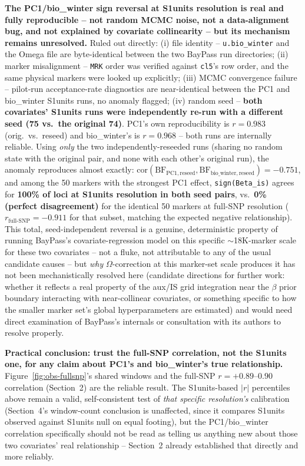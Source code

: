 \documentclass[11pt]{article}
\begin{document}
\textbf{The PC1/bio\_winter sign reversal at S1units resolution is real and fully
reproducible -- not random MCMC noise, not a data-alignment bug, and not explained by
covariate collinearity -- but its mechanism remains unresolved.} Ruled out directly:
(i) file identity -- \texttt{u.bio\_winter} and the Omega file are byte-identical between the
two BayPass run directories; (ii) marker misalignment -- \texttt{MRK} order was verified
against \texttt{cl5}'s row order, and the same physical markers were looked up explicitly;
(iii) MCMC convergence failure -- pilot-run acceptance-rate diagnostics are near-identical
between the PC1 and bio\_winter S1units runs, no anomaly flagged; (iv) random seed --
\textbf{both covariates' S1units runs were independently re-run with a different seed (75 vs.\
the original 74)}. PC1's own reproducibility is $r=0.983$ (orig.\ vs.\ reseed) and
bio\_winter's is $r=0.968$ -- both runs are internally reliable. Using \emph{only} the two
independently-reseeded runs (sharing no random state with the original pair, and none with
each other's original run), the anomaly reproduces almost exactly:
$\mathrm{cor}(\mathrm{BF}_{\mathrm{PC1,reseed}},\mathrm{BF}_{\mathrm{bio\_winter,reseed}})=-0.751$,
and among the 50 markers with the strongest PC1 effect, \texttt{sign(Beta\_is)} agrees for
\textbf{100\% of loci at S1units resolution in both seed pairs}, vs.\ \textbf{0\% (perfect
disagreement)} for the identical 50 markers at full-SNP resolution
($r_{\mathrm{full\text{-}SNP}}=-0.911$ for that subset, matching the expected negative
relationship). This total, seed-independent reversal is a genuine, deterministic property of
running BayPass's covariate-regression model on this specific $\sim$18K-marker scale for
these two covariates -- not a fluke, not attributable to any of the usual candidate causes --
but \emph{why} $\Omega$-correction at this marker-set scale produces it has not been
mechanistically resolved here (candidate directions for further work: whether it reflects a
real property of the aux/IS grid integration near the $\beta$ prior boundary interacting with
near-collinear covariates, or something specific to how the smaller marker set's global
hyperparameters are estimated) and would need direct examination of BayPass's internals or
consultation with its authors to resolve properly.

\textbf{Practical conclusion: trust the full-SNP correlation, not the S1units one, for any
claim about PC1's and bio\_winter's true relationship.} Figure~\ref{fig:obs-fullsnp}'s shared
windows and the full-SNP $r=+0.89$--$0.90$ correlation (Section~2) are the reliable result.
The S1units-based $|r|$ percentiles above remain a valid, self-consistent test of \emph{that
specific resolution's} calibration (Section~4's window-count conclusion is unaffected, since
it compares S1units observed against S1units null on equal footing), but the PC1/bio\_winter
correlation specifically should not be read as telling us anything new about those two
covariates' real relationship -- Section~2 already established that directly and more
reliably.
\end{document}
